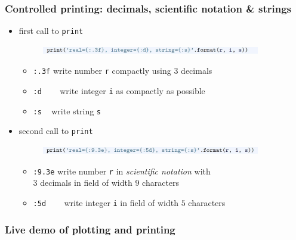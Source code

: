 \documentclass[14pt]{beamer}
\newcommand\red[1]{{\color{red} #1}}
\begin{document}
\begin{frame}[fragile]

\frametitle{Controlled printing: decimals, scientific notation \& strings}

\begin{itemize}
\item first call to \texttt{print}

\begin{figure}[ht]
	\centering
	\includegraphics[width=0.9\textwidth]{figures/LLp30a}
\end{figure}
\vspace*{-3mm}
	\begin{itemize}
		\item \texttt{:.3f} \quad write number \texttt{r} compactly using 3 decimals
		\item \texttt{:d} \quad~~~ write integer \texttt{i} as compactly as possible
		\item \texttt{:s} \quad\quad~\!\! write string \texttt{s}
	\end{itemize}
	
\item second call to \texttt{print}
\begin{figure}[ht]
	\centering
	\includegraphics[width=0.9\textwidth]{figures/LLp30b}
\end{figure}
\vspace*{-3mm}
	\begin{itemize}
		\item \texttt{:9.3e} \quad write number \texttt{r} in \red{\emph{scientific notation}} with \\
		\qquad\qquad\qquad $3$ decimals in field of width $9$ characters
		\item \texttt{:5d} \quad~~~ write integer \texttt{i} in field of width $5$ characters
	\end{itemize}
\end{itemize}

\end{frame}


\begin{frame}[fragile]
\frametitle{Live demo of plotting and printing}

\end{frame}
\end{document}
